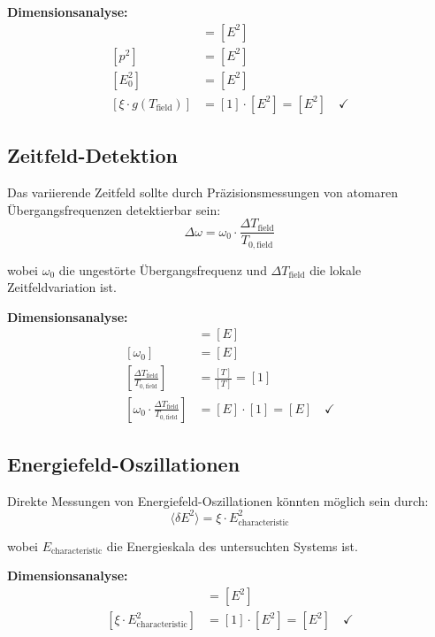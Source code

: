 \documentclass[12pt,a4paper]{report}
\begin{document}
	\textbf{Dimensionsanalyse:}
	\begin{align}
		[E^2] &= [E^2] \\
		[p^2] &= [E^2] \\
		[E_0^2] &= [E^2] \\
		[\xi \cdot g(T_{\text{field}})] &= [1] \cdot [E^2] = [E^2] \quad \checkmark
	\end{align}
	
	\subsection{Zeitfeld-Detektion}
	
	Das variierende Zeitfeld sollte durch Präzisionsmessungen von atomaren Übergangsfrequenzen detektierbar sein:
	\begin{equation}
		\Delta\omega = \omega_0 \cdot \frac{\Delta T_{\text{field}}}{T_{0,\text{field}}}
	\end{equation}
	
	wobei $\omega_0$ die ungestörte Übergangsfrequenz und $\Delta T_{\text{field}}$ die lokale Zeitfeldvariation ist.
	
	\textbf{Dimensionsanalyse:}
	\begin{align}
		[\Delta\omega] &= [E] \\
		[\omega_0] &= [E] \\
		\left[\frac{\Delta T_{\text{field}}}{T_{0,\text{field}}}\right] &= \frac{[T]}{[T]} = [1] \\
		\left[\omega_0 \cdot \frac{\Delta T_{\text{field}}}{T_{0,\text{field}}}\right] &= [E] \cdot [1] = [E] \quad \checkmark
	\end{align}
	
	\subsection{Energiefeld-Oszillationen}
	
	Direkte Messungen von Energiefeld-Oszillationen könnten möglich sein durch:
	\begin{equation}
		\langle \delta E^2 \rangle = \xi \cdot E_{\text{characteristic}}^2
	\end{equation}
	
	wobei $E_{\text{characteristic}}$ die Energieskala des untersuchten Systems ist.
	
	\textbf{Dimensionsanalyse:}
	\begin{align}
		[\langle \delta E^2 \rangle] &= [E^2] \\
		[\xi \cdot E_{\text{characteristic}}^2] &= [1] \cdot [E^2] = [E^2] \quad \checkmark
	\end{align}
	
\end{document}
